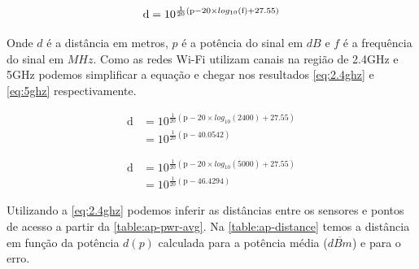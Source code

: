 \begin{equation}
	\text{d} = 10 ^{ \frac{1}{20} \left( \text{p} - 20 \times log_{10}\left(\text{f}\right)  + 27.55 \right) } \\
\end{equation}

Onde $d$ é a distância em metros, $p$ é a potência do sinal em $dB$ e $f$
é a frequência do sinal em $MHz$. Como as redes Wi-Fi utilizam canais na região
de 2.4GHz e 5GHz \cite{ieee80211} podemos simplificar a equação e chegar nos
resultados \autoref{eq:2.4ghz} e \autoref{eq:5ghz} respectivamente.

\begin{align}
\text{d}	&= 10 ^{ \frac{1}{20} \left( \text{p} - 20 \times log_{10}\left(\text{2400}\right)  + 27.55 \right) } \nonumber \\
			&= 10 ^{ \frac{1}{20} \left( \text{p} - 40.0542 \right) } \label{eq:2.4ghz}
\end{align}

\begin{align}
\text{d}	&= 10 ^{ \frac{1}{20} \left( \text{p} - 20 \times log_{10}\left(\text{5000}\right)  + 27.55 \right) } \nonumber \\
			&= 10 ^{ \frac{1}{20} \left( \text{p} - 46.4294 \right) } \label{eq:5ghz}
\end{align}

Utilizando a \autoref{eq:2.4ghz} podemos inferir as distâncias entre os sensores
e pontos de acesso a partir da \autoref{table:ap-pwr-avg}. Na
\autoref{table:ap-distance} temos a distância em função da potência $d(p)$
calculada para a potência média ($\overline{dBm}$) e para o erro.


\begin{table}[htb]
\end{table}

